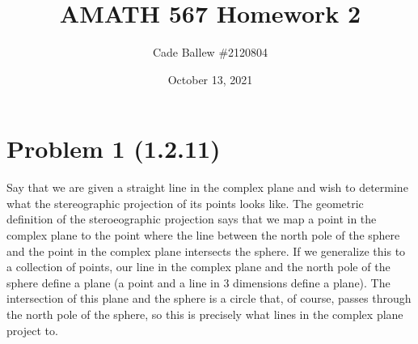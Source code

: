 \documentclass{article}
\title{AMATH 567 Homework 2}
\author{Cade Ballew \#2120804}
\date{October 13, 2021}
\begin{document}
\maketitle

\section{Problem 1 (1.2.11)}
Say that we are given a straight line in the complex plane and wish to determine what the stereographic projection of its points looks like. The geometric definition of the steroeographic projection says that we map a point in the complex plane to the point where the line between the north pole of the sphere and the point in the complex plane intersects the sphere. If we generalize this to a collection of points, our line in the complex plane and the north pole of the sphere define a plane (a point and a line in 3 dimensions define a plane). The intersection of this plane and the sphere is a circle that, of course, passes through the north pole of the sphere, so this is precisely what lines in the complex plane project to.    
\end{document}
